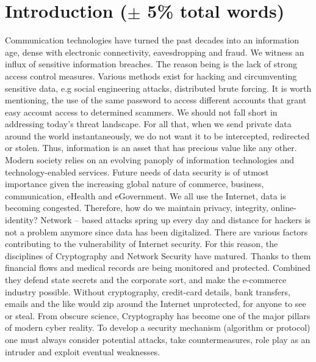\section{Introduction ($\pm$ 5\% total words)}
Communication technologies have turned the past decades into an information age, dense with electronic connectivity, eavesdropping and fraud. We witness an influx of sensitive information breaches. The reason being is the lack of strong access control measures. Various methods exist for hacking and circumventing sensitive data, e.g social engineering attacks, distributed brute forcing. It is worth mentioning, the use of the same password to access different accounts that grant easy account access to determined scammers. We should not fall short in addressing today’s threat landscape. For all that, when we send private data around the world instantaneously, we do not want it to be intercepted, redirected or stolen. Thus, information is an asset that has precious value like any other. Modern society relies on an evolving panoply of information technologies and technology-enabled services. Future needs of data security is of utmost importance given the increasing global nature of commerce, business, communication, eHealth and eGovernment. We all use the Internet, data is becoming congested. Therefore, how do we maintain privacy, integrity, online-identity? Network – based attacks spring up every day and distance for hackers is not a problem anymore since data has been digitalized. There are various factors contributing to the vulnerability of Internet security. For this reason, the disciplines of Cryptography and Network Security have matured. Thanks to them financial flows and medical records are being monitored and protected. Combined they defend state secrets and the corporate sort, and make the e-commerce industry possible. Without cryptography, credit-card details, bank transfers, emails and the like would zip around the Internet unprotected, for anyone to see or steal. From obscure science, Cryptography has become one of the major pillars of modern cyber reality. To develop a security mechanism (algorithm or protocol) one must always consider potential attacks, take countermeasures, role play as an intruder and exploit eventual weaknesses.


